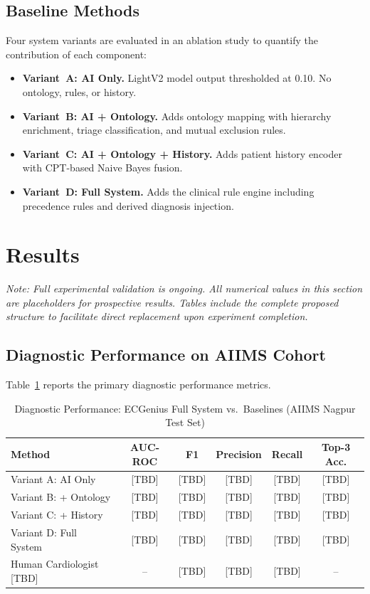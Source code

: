 \documentclass[journal]{IEEEtran}
\begin{document}
\subsection{Baseline Methods}

Four system variants are evaluated in an ablation study to
quantify the contribution of each component:

\begin{itemize}
  \item \textbf{Variant~A: AI Only.} LightV2 model output
        thresholded at 0.10. No ontology, rules, or history.
  \item \textbf{Variant~B: AI + Ontology.} Adds ontology mapping
        with hierarchy enrichment, triage classification, and
        mutual exclusion rules.
  \item \textbf{Variant~C: AI + Ontology + History.} Adds patient
        history encoder with CPT-based Naive Bayes fusion.
  \item \textbf{Variant~D: Full System.} Adds the clinical rule
        engine including precedence rules and derived diagnosis
        injection.
\end{itemize}

\section{Results}
\label{sec:results}

\textit{Note: Full experimental validation is ongoing.
All numerical values in this section are placeholders for
prospective results. Tables include the complete proposed structure
to facilitate direct replacement upon experiment completion.}

\subsection{Diagnostic Performance on AIIMS Cohort}

Table~\ref{tab:main_results} reports the primary diagnostic
performance metrics.

\begin{table}[!t]
\centering
\caption{Diagnostic Performance: ECGenius Full System vs.\ Baselines
         (AIIMS Nagpur Test Set)}
\label{tab:main_results}
\setlength{\tabcolsep}{3pt}
\begin{tabular}{@{}lccccc@{}}
  \toprule
  Method & AUC-ROC & F1 & Precision & Recall & Top-3 Acc. \\
  \midrule
  Variant A: AI Only        & [TBD] & [TBD] & [TBD] & [TBD] & [TBD] \\
  Variant B: + Ontology     & [TBD] & [TBD] & [TBD] & [TBD] & [TBD] \\
  Variant C: + History      & [TBD] & [TBD] & [TBD] & [TBD] & [TBD] \\
  Variant D: Full System    & [TBD] & [TBD] & [TBD] & [TBD] & [TBD] \\
  \midrule
  Human Cardiologist [TBD]  & --    & [TBD] & [TBD] & [TBD] & --    \\
  \bottomrule
\end{tabular}
\end{table}
\end{document}
